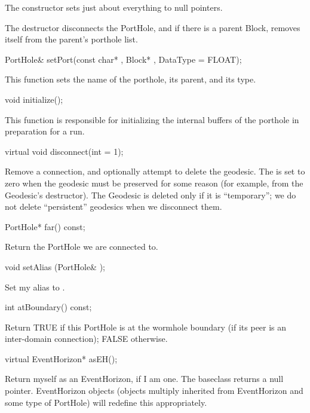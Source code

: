 The constructor sets just about everything to null pointers.

The destructor disconnects the PortHole, and if there is a parent Block,
removes itself from the parent's porthole list.

\begin{example}
PortHole& setPort(const char* , Block* ,
                 DataType  = FLOAT);
\end{example}

This function sets the name of the porthole, its parent, and
its type.

\begin{example}
void initialize();
\end{example}

This function is responsible for initializing the internal buffers
of the porthole in preparation for a run.

\begin{example}
virtual void disconnect(int  = 1);
\end{example}

Remove a connection, and optionally attempt to delete the geodesic.  The
is set to zero when the geodesic must be preserved for some reason (for
example, from the Geodesic's destructor).  The Geodesic is deleted only
if it is ``temporary''; we do not delete ``persistent'' geodesics when
we disconnect them.

\begin{example}
PortHole* far() const;
\end{example}

Return the PortHole we are connected to.

\begin{example}
void setAlias (PortHole& );
\end{example}

Set my alias to .

\begin{example}
int atBoundary() const;
\end{example}

Return TRUE if this PortHole is at the wormhole boundary (if its peer is
an inter-domain connection); FALSE otherwise.

\begin{example}
virtual EventHorizon* asEH();
\end{example}

Return myself as an EventHorizon, if I am one.  The baseclass returns
a null pointer.  EventHorizon objects (objects multiply inherited from
EventHorizon and some type of PortHole) will redefine this
appropriately.

